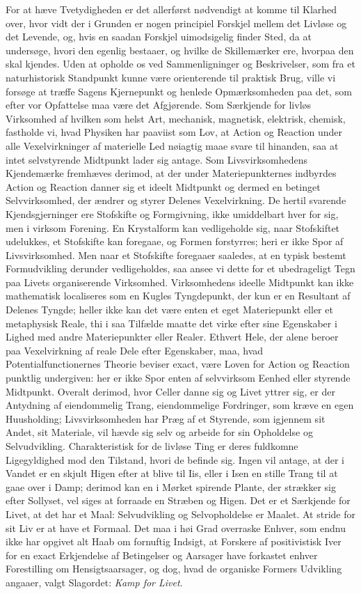 \documentclass[12pt]{article}
\newcommand{\opage}[1]{\marginnote{\footnotesize\textit{[#1]}}}
\begin{document}
For at hæve Tvetydigheden er det allerførst nødvendigt at komme til
Klarhed over, hvor vidt der i Grunden er nogen principiel Forskjel
mellem det Livløse og det Levende, og, hvis en saadan Forskjel
uimodsigelig finder Sted, da at undersøge, hvori den egenlig
bestaaer, og hvilke de Skillemærker ere, hvorpaa den skal kjendes.
Uden at opholde os ved Sammenligninger og Beskrivelser, som fra et
naturhistorisk Standpunkt kunne være orienterende til praktisk Brug,
ville vi forsøge at træffe Sagens Kjernepunkt og henlede
Opmærksomheden paa det, som efter vor Opfattelse maa være det
Afgjørende. Som Særkjende for livløs Virksomhed af hvilken som helst
Art, mechanisk, magnetisk, elektrisk, chemisk, fastholde vi, hvad
Physiken har paaviist som Lov, at Action og Reaction under alle
Vexelvirkninger af materielle Led nøiagtig maae svare til hinanden,
saa at intet selvstyrende Midtpunkt lader sig antage. Som
Livsvirksomhedens Kjendemærke fremhæves derimod, at der under
Materiepunkternes indbyrdes Action og Reaction danner sig et ideelt
Midtpunkt og dermed en betinget Selvvirksomhed, der ændrer og styrer
Delenes Vexelvirkning. De hertil svarende Kjendsgjerninger ere
Stofskifte og Formgivning, ikke umiddelbart hver for sig, men i
virksom Forening. En Krystalform kan vedligeholde sig, naar
Stofskiftet udelukkes, et Stofskifte kan foregaae, og Formen
forstyrres; heri er ikke Spor af Livsvirksomhed. Men naar et
Stofskifte foregaaer saaledes, at en typisk bestemt Formudvikling
derunder vedligeholdes, saa ansee vi dette for et ubedrageligt Tegn
paa Livets organiserende Virksomhed. Virksomhedens ideelle Midtpunkt
kan ikke mathematisk localiseres som en Kugles Tyngdepunkt, der kun
er en Resultant af Delenes Tyngde; heller ikke kan det være enten et
eget Materiepunkt eller et metaphysisk Reale, thi i saa Tilfælde
maatte det virke efter sine Egenskaber i Lighed med andre
Materiepunkter eller Realer. Ethvert Hele, der alene beroer paa
Vexelvirkning af reale Dele efter Egenskaber, maa, hvad
Potentialfunctionernes Theorie beviser exact, være Loven
\opage{54} for Action og Reaction punktlig undergiven: her er ikke Spor enten
af selvvirksom Eenhed eller styrende Midtpunkt. Overalt derimod,
hvor Celler danne sig og Livet yttrer sig, er der Antydning af
eiendommelig Trang, eiendommelige Fordringer, som kræve en egen
Huusholding; Livsvirksomheden har Præg af et Styrende, som igjennem
sit Andet, sit Materiale, vil hævde sig selv og arbeide for sin
Opholdelse og Selvudvikling. Charakteristisk for de livløse Ting er
deres fuldkomne Ligegyldighed mod den Tilstand, hvori de befinde
sig. Ingen vil antage, at der i Vandet er en skjult Higen efter at
blive til Iis, eller i Isen en stille Trang til at gaae over i Damp;
derimod kan en i Mørket spirende Plante, der strækker sig efter
Sollyset, vel siges at forraade en Stræben og Higen. Det er et
Særkjende for Livet, at det har et Maal: Selvudvikling og
Selvopholdelse er Maalet. At stride for sit Liv er at have et
Formaal. Det maa i høi Grad overraske Enhver, som endnu ikke har
opgivet alt Haab om fornuftig Indsigt, at Forskere af positivistisk
Iver for en exact Erkjendelse af Betingelser og Aarsager have
forkastet enhver Forestilling om Hensigtsaarsager, og dog, hvad de
organiske Formers Udvikling angaaer, valgt Slagordet: \emph{Kamp for
Livet}.
\end{document}
